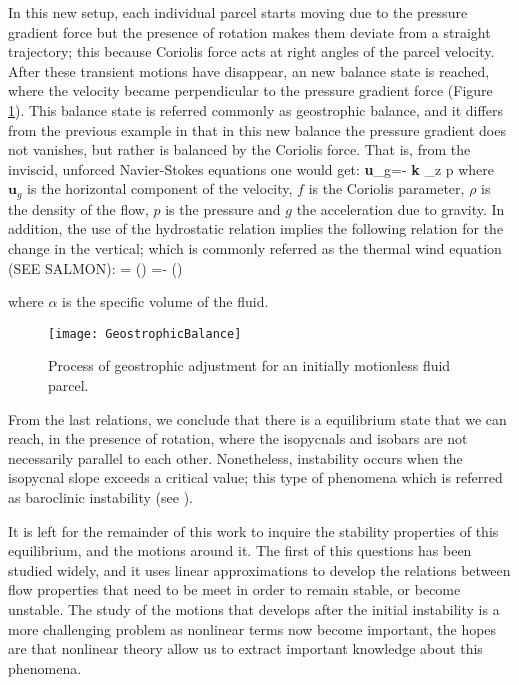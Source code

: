 In this new setup, each individual parcel starts moving due to the pressure gradient force but the presence of rotation makes them deviate from a straight trajectory; this because Coriolis force acts at right angles of the parcel velocity. After these transient motions have disappear, an new balance state is reached, where the velocity became perpendicular to the pressure gradient force (Figure \ref{f:GBalance}). This balance state is referred commonly as geostrophic balance, and it differs from the previous example in that in this new balance the pressure gradient does not vanishes, but rather is balanced by the Coriolis force. That is, from the inviscid, unforced Navier-Stokes equations one would get:
\beq
\textbf{u}_g=- \textbf{k} \times \nabla_z p
where $\textbf{u}_g$ is the horizontal component of the velocity, $f$ is the Coriolis parameter, $\rho$ is the density of the flow, $p$ is the pressure and $g$ the acceleration due to gravity. In addition, the use of the hydrostatic relation implies the following relation for the change in the vertical; which is commonly referred as the thermal wind equation (SEE SALMON):
\beq
{} = \left(\right)
\beq
{} =- \left(\right)

where $\alpha$ is the specific volume of the fluid.
\begin{figure}
\begin{center}
  \texttt{[image: GeostrophicBalance]}\\
\end{center}
  \caption{Process of geostrophic adjustment for an initially motionless fluid parcel.}
  \label{f:GBalance}
\end{figure}

From the last relations, we conclude that there is a equilibrium state that we can reach, in the presence of rotation, where the isopycnals and isobars are not necessarily parallel to each other. Nonetheless, instability occurs when the isopycnal slope exceeds a critical value; this type of phenomena which is referred as baroclinic instability (see ).

It is left for the remainder of this work to inquire the stability properties of this equilibrium, and the motions around it. The first of this questions has been studied widely, and it uses linear approximations to develop the relations between flow properties that need to be meet in order to remain stable, or become unstable. The study of the motions that develops after the initial instability is a more challenging problem as nonlinear terms now become important, the hopes are that nonlinear theory allow us to extract important knowledge about this phenomena.
